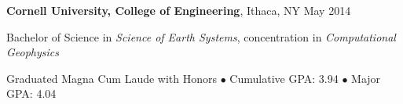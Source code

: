 
\textbf{Cornell University, College of Engineering}, Ithaca, NY \hfill May 2014

Bachelor of Science in \textit{Science of Earth Systems}, concentration in \textit{Computational Geophysics}

Graduated Magna Cum Laude with Honors $\bullet$ Cumulative GPA: 3.94 $\bullet$ Major GPA: 4.04
